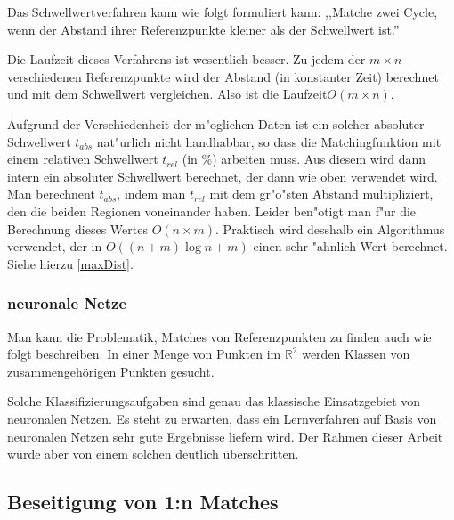 Das Schwellwertverfahren kann wie folgt formuliert kann: ,,Matche zwei Cycle, wenn der Abstand ihrer Referenzpunkte kleiner als der Schwellwert ist.''

Die Laufzeit dieses Verfahrens ist wesentlich besser. Zu jedem der $m\times n$ verschiedenen  Referenzpunkte wird der  Abstand (in konstanter Zeit) berechnet und mit dem Schwellwert vergleichen. Also ist die Laufzeit$O(m\times n)$.

Aufgrund der Verschiedenheit der m"oglichen Daten ist ein solcher absoluter Schwellwert $t_{abs}$ nat"urlich nicht handhabbar, so dass die Matchingfunktion mit einem relativen Schwellwert $t_{rel}$ (in \%) arbeiten muss. Aus diesem wird dann intern ein absoluter Schwellwert berechnet, der dann wie oben verwendet wird. Man berechnent $t_{abs}$, indem man $t_{rel}$ mit dem gr"o"sten Abstand multipliziert, den die beiden Regionen voneinander haben. Leider ben"otigt man f"ur die Berechnung dieses Wertes $O(n\times m)$. Praktisch wird desshalb ein Algorithmus verwendet, der in $O((n+m)\log{n+m})$ einen sehr "ahnlich Wert berechnet. Siehe hierzu \ref{maxDist}.

\subsubsection*{neuronale Netze}

Man kann die Problematik, Matches von Referenzpunkten zu finden auch wie folgt beschreiben. In einer Menge von Punkten im $\mathbb{R}^2$ werden Klassen von zusammengehörigen Punkten gesucht.

Solche Klassifizierungsaufgaben sind genau das klassische Einsatzgebiet von neuronalen Netzen. Es steht zu erwarten, dass ein Lernverfahren auf Basis von neuronalen Netzen sehr gute Ergebnisse liefern wird. Der Rahmen dieser Arbeit würde aber von einem solchen deutlich überschritten.

\subsection{Beseitigung von 1:n Matches}\label{1zuN}

